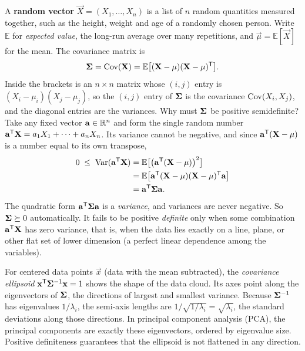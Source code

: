 A \textbf{random vector} $\vec{X} = (X_1,\dots,X_n)$ is a list of $n$ random quantities measured
together, such as the height, weight and age of a randomly chosen person. Write $\mathbb{E}$ for
\emph{expected value}, the long-run average over many repetitions, and $\vec{\mu} =
\mathbb{E}[\vec{X}]$ for the mean. The covariance matrix is
\[
  \mathbf{\Sigma} = \operatorname{Cov}(\mathbf{X}) = \mathbb{E}\big[(\mathbf{X}-\mathbf{\mu})(\mathbf{X}-\mathbf{\mu})^{\mathsf{T}}\big].
\]
Inside the brackets is an $n\times n$ matrix whose $(i,j)$ entry is $(X_i-\mu_i)(X_j-\mu_j)$, so the
$(i,j)$ entry of $\mathbf{\Sigma}$ is the covariance $\operatorname{Cov}(X_i,X_j)$, and the diagonal entries are the
variances. Why must $\mathbf{\Sigma}$ be positive semidefinite? Take any fixed vector
$\mathbf{a}\in\mathbb{R}^n$ and form the single random number $\mathbf{a}^{\mathsf{T}}\mathbf{X} = a_1X_1 + \cdots + a_nX_n$.
Its variance cannot be negative, and since $\mathbf{a}^{\mathsf{T}}(\mathbf{X}-\mathbf{\mu})$ is a number equal to its
own transpose,
\begin{align*}
  0 \;\leq\; \operatorname{Var}(\mathbf{a}^{\mathsf{T}}\mathbf{X})
  &= \mathbb{E}\big[\big(\mathbf{a}^{\mathsf{T}}(\mathbf{X}-\mathbf{\mu})\big)^2\big] \\
  &= \mathbb{E}\big[\mathbf{a}^{\mathsf{T}}(\mathbf{X}-\mathbf{\mu})(\mathbf{X}-\mathbf{\mu})^{\mathsf{T}}\mathbf{a}\big] \\
  &= \mathbf{a}^{\mathsf{T}}\mathbf{\Sigma}\mathbf{a}.
\end{align*}
The quadratic form $\mathbf{a}^{\mathsf{T}}\mathbf{\Sigma}\mathbf{a}$ is a \emph{variance}, and variances are never
negative. So $\mathbf{\Sigma}\succeq0$ automatically. It fails to be positive \emph{definite} only when
some combination $\mathbf{a}^{\mathsf{T}}\mathbf{X}$ has zero variance, that is, when the data lies exactly on a
line, plane, or other flat set of lower dimension (a perfect linear dependence among the variables).

\begin{intuitionbox}
For centered data points $\vec{x}$ (data with the mean subtracted), the \emph{covariance ellipsoid}
$\mathbf{x}^{\mathsf{T}}\mathbf{\Sigma}^{-1}\mathbf{x} = 1$ shows the shape of the data cloud. Its axes point along the
eigenvectors of $\mathbf{\Sigma}$, the directions of largest and smallest variance. Because
$\mathbf{\Sigma}^{-1}$ has eigenvalues $1/\lambda_i$, the semi-axis lengths are $1/\sqrt{1/\lambda_i} =
\sqrt{\lambda_i}$, the standard deviations along those directions. In principal component analysis
(PCA), the principal components are exactly these eigenvectors, ordered by eigenvalue size. Positive
definiteness guarantees that the ellipsoid is not flattened in any direction.
\end{intuitionbox}

